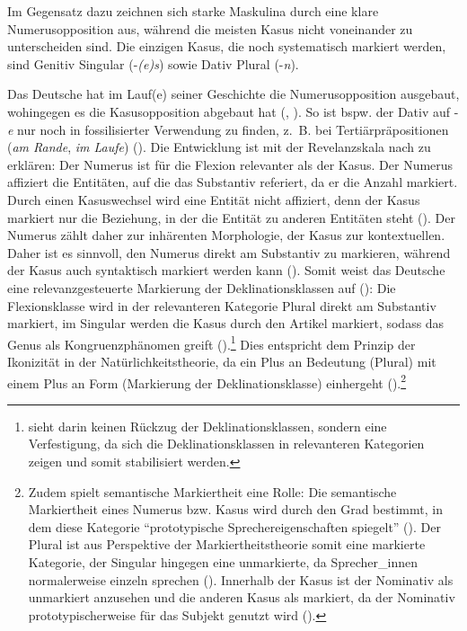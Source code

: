 Im Gegensatz dazu zeichnen sich starke Maskulina durch eine klare Numerusopposition aus,  während die meisten Kasus nicht voneinander zu unterscheiden sind. Die einzigen Kasus, die noch systematisch markiert werden, sind Genitiv Singular (-\textit{(e)s}) sowie Dativ Plural (-\textit{n}). 

Das Deutsche hat im Lauf(e) seiner Geschichte die Numerusopposition ausgebaut, wohingegen es die Kasusopposition abgebaut hat (\cite[326--330]{Hotzenkocherle.1962}, \cite[304--319]{Sonderegger.1979, WegeraSolms.2000}). So ist bspw. der Dativ auf -\textit{e} nur noch in fossilisierter Verwendung zu finden, z.~B. bei Tertiärpräpositionen (\textit{am Rande}, \textit{im Laufe})  (\cite[101]{Szczepaniak.2011b}). Die Entwicklung ist mit der Revelanzskala nach \textcite{Bybee.1985} zu erklären: Der Numerus ist für die Flexion relevanter als der Kasus. Der Numerus affiziert die Entitäten, auf die das Substantiv referiert, da er die Anzahl markiert. Durch einen Kasuswechsel wird eine Entität nicht affiziert, denn der Kasus markiert nur die Beziehung, in der die Entität zu anderen Entitäten steht (\cite[34]{Bybee.1985}). Der Numerus zählt daher zur inhärenten Morphologie, der Kasus zur kon\-textuellen. Daher ist es sinnvoll, den Numerus direkt am Substantiv zu markieren, während der Kasus auch syntaktisch markiert werden kann (\cite[100]{Dammel.2006}). Somit weist das Deutsche eine relevanzgesteuerte Markierung der Deklinationsklassen auf (\cite[158--159]{Nubling.2016}): Die Flexionsklasse wird in der relevanteren Kategorie Plural direkt am Substantiv markiert, im Singular werden die Kasus durch den Artikel markiert, sodass das Genus als Kongruenzphänomen greift (\cite[165--167]{Nubling.2016}).\footnote{\textcite[158--159]{Nubling.2016} sieht darin keinen Rückzug der Deklinationsklassen, sondern eine Verfestigung, da sich die Deklinationsklassen in relevanteren Kategorien zeigen und somit stabilisiert werden.} Dies entspricht dem Prinzip der Ikonizität in der Natürlichkeitstheorie, da ein Plus an Bedeutung (Plural) mit einem Plus an Form (Markierung der Deklinationsklasse) einhergeht (\cite[23]{Wurzel.1984}).\footnote{Zudem spielt semantische Markiertheit eine Rolle: Die semantische Markiertheit eines Numerus bzw. Kasus wird durch den Grad bestimmt, in dem diese Kategorie "`prototypische Sprechereigenschaften spiegelt"' (\cite[21]{Wurzel.1984}). Der Plural ist aus Perspektive der Markiertheitstheorie somit eine markierte Kategorie, der Singular hingegen eine unmarkierte, da Sprecher\_innen normalerweise einzeln sprechen (\cite[22]{Wurzel.1984}). Innerhalb der Kasus ist der Nominativ als unmarkiert anzusehen und die anderen Kasus als markiert, da der Nominativ prototypischerweise für das Subjekt genutzt wird (\cite[22]{Wurzel.1984}).} 

